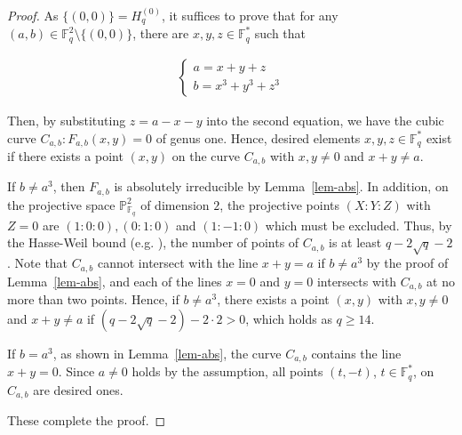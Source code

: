 \documentclass{amsart}
\numberwithin{equation}{section}
\newcommand{\F}{\mathbb{F}}
\begin{document}
\begin{proof}
As $\{(0,0)\}=H_q^{(0)}$,
it suffices to prove that for any $(a, b) \in \F_q^2 \setminus \{(0,0)\}$, there are $x, y, z \in \F_q^*$ such that 

\begin{align*}
  \begin{cases}
    a=x+y+z  \\
    b=x^3+y^3+z^3
  \end{cases}
\end{align*}

Then, by substituting $z=a-x-y$ into the second equation,
we have the cubic curve $C_{a,b}:F_{a,b}(x,y)=0$ of genus one.
% 
Hence, desired elements $x, y, z \in \F_q^*$ exist if there exists a point $(x,y)$ on the curve $C_{a,b}$ with $x, y \neq 0$ and $x+y\neq a$.

If $b \neq a^3$, then $F_{a,b}$ is absolutely irreducible by Lemma~\ref{lem-abs}. 
In addition, on the projective space $\mathbb{P}^2_{\F_q}$ of dimension $2$, the projective points $(X:Y:Z)$ with $Z=0$ are $(1:0:0), (0:1:0)$ and $(1:-1:0)$ which must be excluded.
Thus, by the Hasse-Weil bound (e.g. \cite{S1986}),
the number of points of $C_{a,b}$ is at least $q-2\sqrt{q}-2$.
Note that $C_{a,b}$ cannot intersect with the line $x+y=a$ if $b\neq a^3$ by the proof of Lemma~\ref{lem-abs}, and each of the lines $x=0$ and $y=0$ intersects with $C_{a,b}$ at no more than two points.
Hence, if $b \neq a^3$, there exists a point $(x,y)$ with $x, y \neq 0$ and $x+y\neq a$ if $(q-2\sqrt{q}-2)-2\cdot2>0$, which holds as $q\geq 14$.

If $b=a^3$, as shown in Lemma~\ref{lem-abs}, the curve $C_{a,b}$ contains the line $x+y=0$. 
Since $a\neq 0$ holds by the assumption, all points $(t,-t)$, $t \in \F_q^*$, on $C_{a,b}$ are desired ones.

These complete the proof.
\end{proof}
\end{document}
